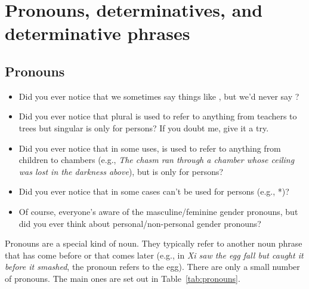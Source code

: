 \section{Pronouns, determinatives, and determinative phrases}

\subsection{Pronouns}\label{sec:pronouns}
\begin{itemize}[noitemsep]
    \item Did you ever notice that we sometimes say things like , but we'd never say ?
    \item Did you ever notice that plural  is used to refer to anything from teachers to trees but singular  is only for persons? If you doubt me, give it a try.
    \item Did you ever notice that in some uses,  is used to refer to anything from children to chambers (e.g., \textit{The chasm ran through a chamber whose ceiling was lost in the darkness above}), but  is only for persons?
    \item Did you ever notice that in some cases  can't be used for persons (e.g., *)?
    \item Of course, everyone's aware of the masculine/feminine gender pronouns, but did you ever think about personal/non-personal gender pronouns?
\end{itemize}

Pronouns are a special kind of noun. They typically refer to another noun phrase that has come before or that comes later (e.g., in \textit{Xi saw \emph{the egg} fall but caught \emph{it} before \emph{it} smashed}, the pronoun  refers to the egg). There are only a small number of pronouns. The main ones are set out in Table~\ref{tab:pronouns}.

